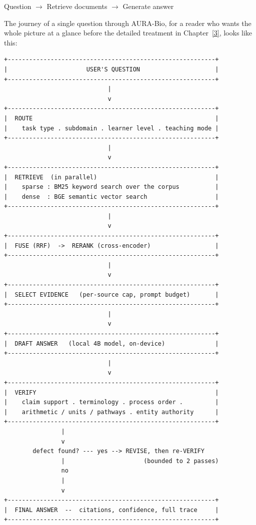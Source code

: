\begin{center}
\ttfamily
Question $\rightarrow$ Retrieve documents $\rightarrow$ Generate answer
\end{center}

The journey of a single question through AURA-Bio, for a reader who wants
the whole picture at a glance before the detailed treatment in
Chapter~\ref{3}, looks like this:

\begin{center}
\begin{minipage}{\textwidth}
\centering
\footnotesize
\begin{verbatim}
+----------------------------------------------------------+
|                      USER'S QUESTION                     |
+----------------------------------------------------------+
                             |
                             v
+----------------------------------------------------------+
|  ROUTE                                                   |
|    task type . subdomain . learner level . teaching mode |
+----------------------------------------------------------+
                             |
                             v
+----------------------------------------------------------+
|  RETRIEVE  (in parallel)                                 |
|    sparse : BM25 keyword search over the corpus          |
|    dense  : BGE semantic vector search                   |
+----------------------------------------------------------+
                             |
                             v
+----------------------------------------------------------+
|  FUSE (RRF)  ->  RERANK (cross-encoder)                  |
+----------------------------------------------------------+
                             |
                             v
+----------------------------------------------------------+
|  SELECT EVIDENCE   (per-source cap, prompt budget)       |
+----------------------------------------------------------+
                             |
                             v
+----------------------------------------------------------+
|  DRAFT ANSWER   (local 4B model, on-device)              |
+----------------------------------------------------------+
                             |
                             v
+----------------------------------------------------------+
|  VERIFY                                                  |
|    claim support . terminology . process order .         |
|    arithmetic / units / pathways . entity authority      |
+----------------------------------------------------------+
                |
                v
        defect found? --- yes --> REVISE, then re-VERIFY
                |                      (bounded to 2 passes)
                no
                |
                v
+----------------------------------------------------------+
|  FINAL ANSWER  --  citations, confidence, full trace     |
+----------------------------------------------------------+
\end{verbatim}
\end{minipage}
\end{center}

